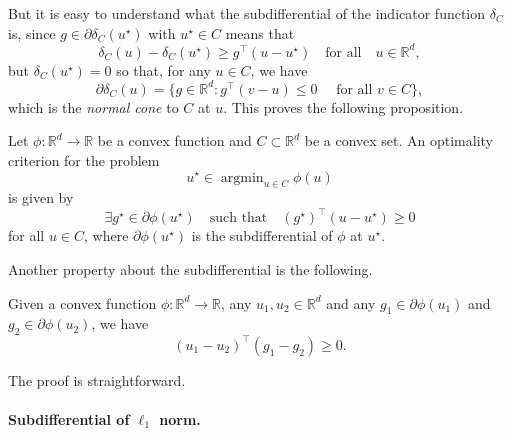 \documentclass[
	fontsize=11pt, %
	twoside=false, %
	numbers=noenddot, %
]{kaobook}
\DeclareMathOperator*{\argmin}{argmin}
\newcommand{\R}{\mathbb R}
\begin{document}
But it is easy to understand what the subdifferential of the indicator function $\delta_C$ is, since $g \in \partial \delta_C(u^\star)$ with $u^\star \in C$ means%
that
\begin{equation*}
	\delta_C(u) - \delta_C(u^\star) \geq g^\top (u - u^\star) \quad \text{for all} \quad u \in \R^d,
\end{equation*}
but $\delta_C(u^\star) = 0$ so that, for any $u \in C$, we have
\begin{equation*}
	\partial \delta_C(u) = \big\{ g \in \R^d : g^\top (v - u) \leq 0 \quad 
	\text{ for all } v \in C \big\},
\end{equation*}
which is the \emph{normal cone} to $C$ at $u$.
This proves the following proposition.
\begin{proposition}
	\label{prop:optimality-criterion}
	Let $\phi : \R^d \rightarrow \R$ be a convex function and $C \subset \R^d$ be a convex set. 
	An optimality criterion for the problem
	\begin{equation*}
		u^\star \in \argmin_{u \in C} \phi(u)
	\end{equation*}
	is given by
	\begin{equation*}
		\exists g^\star \in \partial \phi(u^\star) \quad \text{such that} 
		\quad (g^\star)^\top (u - u^\star) \geq 0
	\end{equation*}
	for all $u \in C$, where $\partial \phi(u^\star)$ is the subdifferential of $\phi$ at $u^\star$.
\end{proposition}

Another property about the subdifferential is the following.
\begin{proposition}
	Given a convex function $\phi : \R^d \rightarrow \R$, any $u_1, u_2 \in \R^d$ and any $g_1 \in \partial \phi(u_1)$ and $g_2 \in \partial \phi(u_2)$, we have
	\begin{equation*}
		(u_1 - u_2)^\top (g_1 - g_2) \geq 0.
	\end{equation*}
\end{proposition}
The proof is straightforward.%

\paragraph{Subdifferential of $\ell_1$ norm.} 
\end{document}

